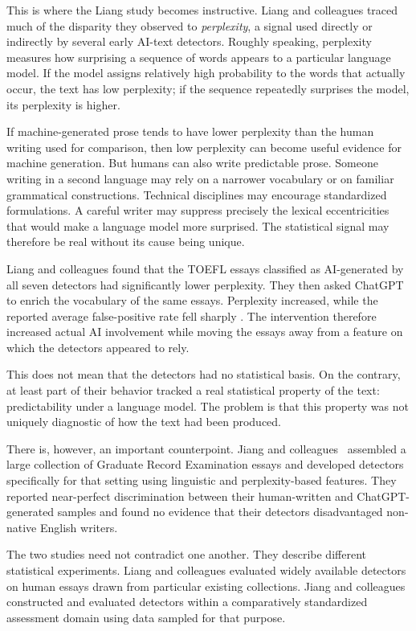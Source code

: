 \documentclass[pdflatex,sn-mathphys-num]{sn-jnl}
\begin{document}
This is where the Liang study becomes instructive. Liang and colleagues traced much of the disparity they observed to \emph{perplexity}, a signal used directly or indirectly by several early AI-text detectors. 
Roughly speaking, perplexity measures how surprising a sequence of words appears to a particular language model. If the model assigns relatively high probability 
to the words that actually occur, the text has low perplexity; if the sequence repeatedly surprises the model, its perplexity is higher.

If machine-generated prose tends to have lower perplexity than the human writing used for comparison, then low perplexity can become useful 
evidence for machine generation. But humans can also write predictable prose. Someone writing in a second language may rely on a narrower 
vocabulary or on familiar grammatical constructions. Technical disciplines may encourage standardized formulations. A careful writer may suppress 
precisely the lexical eccentricities that would make a language model more surprised. The statistical signal may therefore be real without its cause being unique.

Liang and colleagues found that the TOEFL essays classified as AI-generated by all seven detectors had significantly lower perplexity. They then asked 
ChatGPT to enrich the vocabulary of the same essays. Perplexity increased, while the reported average false-positive rate fell sharply \cite{Liang2023}.
The intervention therefore increased actual AI involvement while moving the essays away from a feature on which the detectors appeared to rely.

This does not mean that the detectors had no statistical basis. On the contrary, at least part of their behavior tracked a real statistical property of the 
text: predictability under a language model. The problem is that this property was not uniquely diagnostic of how the text had been produced.

There is, however, an important counterpoint. Jiang and colleagues~\cite{Jiang2024} assembled a large collection of Graduate Record Examination 
essays and developed detectors specifically for that setting using linguistic and perplexity-based features. They reported near-perfect 
discrimination between their human-written and ChatGPT-generated samples and found no evidence that their detectors disadvantaged non-native 
English writers.

The two studies need not contradict one another. They describe different statistical experiments. Liang and colleagues evaluated widely available 
detectors on human essays drawn from particular existing collections. Jiang and colleagues constructed and evaluated detectors within a comparatively 
standardized assessment domain using data sampled for that purpose.
\end{document}
